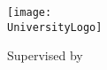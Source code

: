\begin{center}

    {\Huge \bfseries \TitleName \par}
    \null\vfill
    
    
    \texttt{[image: \\UniversityLogo]}
    \null\vfill


    {\huge \bfseries \AuthorName \par}
    {\LARGE \CollegeName \par}

    \null\vfill

    {\Large

    \vspace*{\baselineskip}
    \DegreePrefix \par
    \DegreeName

    \vspace*{\baselineskip}
    Supervised by \\ \SupervisorName

    \vspace*{\baselineskip}
    \DepartmentName \\ \UniversityName

    \null\vfill
    \DegreeDate
    }
        
\end{center}
